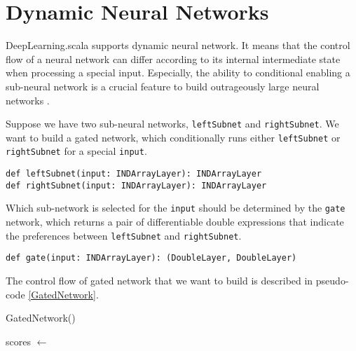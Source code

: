 \section{Dynamic Neural Networks}

DeepLearning.scala supports dynamic neural network. It means that the control flow of a neural network can differ according to its internal intermediate state when processing a special input. Especially, the ability to conditional enabling a sub-neural network is a crucial feature to build outrageously large neural networks \cite{shazeer2017outrageously}.

Suppose we have two sub-neural networks, \lstinline{leftSubnet} and \lstinline{rightSubnet}. We want to build a gated network, which conditionally runs either \lstinline{leftSubnet} or \lstinline{rightSubnet} for a special \lstinline{input}.

\begin{lstlisting}[float={htbp},caption={Predefined sub-networks}]
def leftSubnet(input: INDArrayLayer): INDArrayLayer
def rightSubnet(input: INDArrayLayer): INDArrayLayer
\end{lstlisting}

Which sub-network is selected for the \lstinline{input} should be determined by the \lstinline{gate} network, which returns a pair of differentiable double expressions that indicate the preferences between \lstinline{leftSubnet} and \lstinline{rightSubnet}.

\begin{lstlisting}[float={htbp},caption={Predefined gate network}]
def gate(input: INDArrayLayer): (DoubleLayer, DoubleLayer)
\end{lstlisting}

The control flow of gated network that we want to build is described in pseudo-code \ref{GatedNetwork}.

\begin{function}[H]
  \caption{GatedNetwork()\label{GatedNetwork}}
  scores $\leftarrow$ \;
\end{function}

